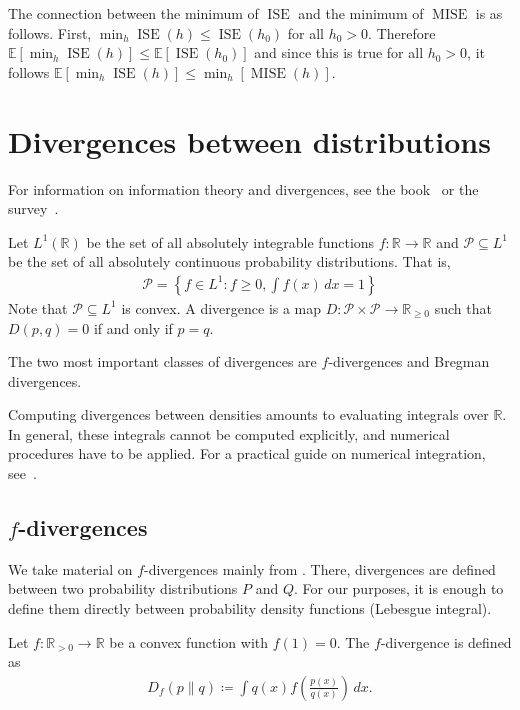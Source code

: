 The connection between the minimum of $\operatorname{ISE}$ and the minimum of $\operatorname{MISE}$ is as follows. First, $\min_h\operatorname{ISE}(h)\le\operatorname{ISE}(h_0)$ for all $h_0>0$. Therefore $\mathbb{E}[\min_h\operatorname{ISE}(h)]\le\mathbb{E}[\operatorname{ISE}(h_0)]$ and since this is true for all $h_0>0$, it follows $\mathbb{E}[\min_h\operatorname{ISE}(h)]\le\min_h[\operatorname{MISE}(h)]$.

\section{Divergences between distributions}\label{sec:divergences}

For information on information theory and divergences, see the book~\cite{polyanskiy_information_2025} or the survey~\cite{nielsen_elementary_2020}.

Let $L^1(\mathbb{R})$ be the set of all absolutely integrable functions $f:\mathbb{R}\to\mathbb{R}$ and $\mathcal{P}\subseteq L^1$ be the set of all absolutely continuous probability distributions. That is,
\begin{align*}
    \mathcal{P}=\left\{f\in L^1:f\ge0,\int f(x)\,dx=1\right\}
\end{align*}
Note that $\mathcal{P}\subseteq L^1$ is convex. A divergence is a map $D:\mathcal{P}\times\mathcal{P}\to\mathbb{R}_{\ge0}$ such that $D(p,q)=0$ if and only if $p=q$.

The two most important classes of divergences are $f$-divergences and Bregman divergences.

Computing divergences between densities amounts to evaluating integrals over $\mathbb{R}$. In general, these integrals cannot be computed explicitly, and numerical procedures have to be applied. For a practical guide on numerical integration, see~\cite[Chapter 9]{DeuflhardHohmann+2019}.

\subsection{\texorpdfstring{$f$}{f}-divergences}

We take material on $f$-divergences mainly from \cite[Chapter 7]{polyanskiy_information_2025}. There, divergences are defined between two probability distributions $P$ and $Q$. For our purposes, it is enough to define them directly between probability density functions (Lebesgue integral).

\begin{Def}
    Let $f:\mathbb{R}_{>0}\to\mathbb{R}$ be a convex function with $f(1)=0$. The $f$-divergence is defined as
    \begin{align*}
        D_f(p\|q)\coloneqq\int q(x)f\left(\frac{p(x)}{q(x)}\right)\,dx.
    \end{align*}
\end{Def}

